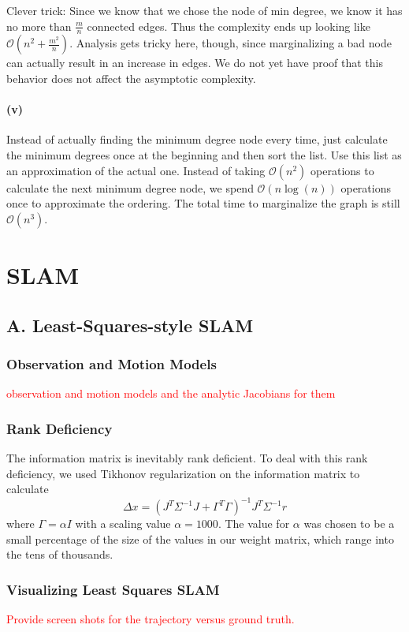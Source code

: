 \documentclass[12pt]{article}
\begin{document}
Clever trick: Since we know that we chose the node of min degree, we know it has
no more than $\frac{m}{n}$ connected edges. Thus the complexity ends up looking
like $\mathcal{O}(n^2 + \frac{m^2}{n})$. Analysis gets tricky here, though,
since marginalizing a bad node can actually result in an increase in edges. We
do not yet have proof that this behavior does not affect the asymptotic
complexity.

\paragraph{(v)}
Instead of actually finding the minimum degree node every time, just calculate
the minimum degrees once at the beginning and then sort the list. Use this list
as an approximation of the actual one. Instead of taking $\mathcal{O}(n^2)$
operations to calculate the next minimum degree node, we spend
$\mathcal{O}(n\log(n))$ operations once to approximate the ordering. The total
time to marginalize the graph is still $\mathcal{O}(n^3)$.

\section{SLAM}

\subsection*{A. Least-Squares-style SLAM}

\subsubsection*{Observation and Motion Models}
\textcolor{red}{observation and motion models and the analytic Jacobians for them}

\subsubsection*{Rank Deficiency}
The information matrix is inevitably rank deficient.  To deal with this rank deficiency, we used Tikhonov regularization on the information matrix to calculate 
$$\Delta x = (J^T \Sigma^{-1}J + \Gamma^T \Gamma)^{-1}J^T \Sigma^{-1} r$$
where $\Gamma = \alpha I$ with a scaling value $\alpha = 1000$.  The value for $\alpha$ was chosen to be a small percentage of the size of the values in our weight matrix, which range into the tens of thousands.


\subsubsection*{Visualizing Least Squares SLAM}
\textcolor{red}{Provide screen shots for the trajectory versus ground truth.}
\end{document}
